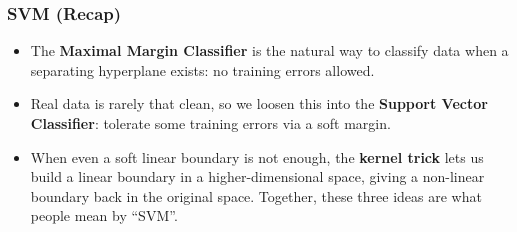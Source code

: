 %
%
%


%
%

%

\begin{frame}[fragile]\frametitle{SVM (Recap)}
\begin{itemize}
\item The \textbf{Maximal Margin Classifier} is the natural way to classify data when a separating hyperplane exists: no training errors allowed.
\item Real data is rarely that clean, so we loosen this into the \textbf{Support Vector Classifier}: tolerate some training errors via a soft margin.
\item When even a soft linear boundary is not enough, the \textbf{kernel trick} lets us build a linear boundary in a higher-dimensional space, giving a non-linear boundary back in the original space. Together, these three ideas are what people mean by ``SVM''.
\end{itemize}
\end{frame}
